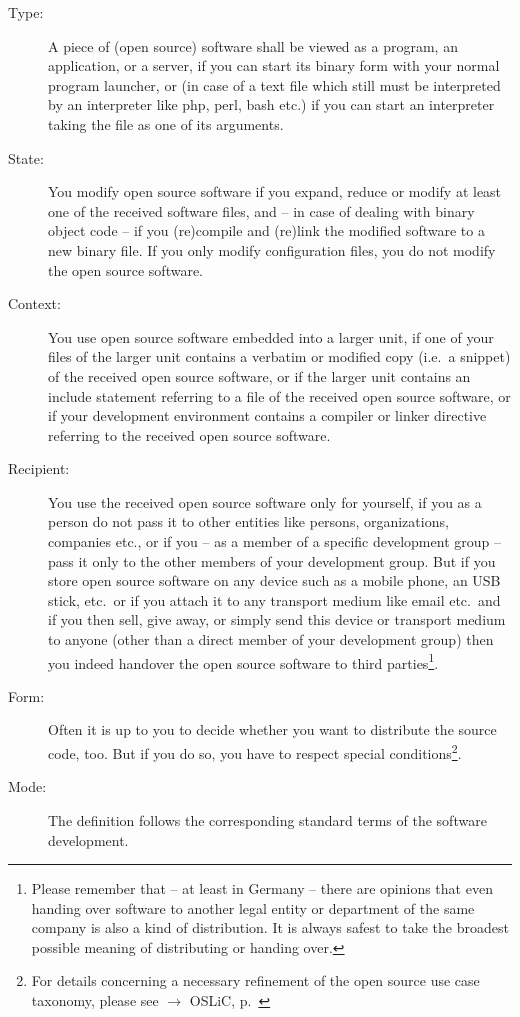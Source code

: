 \begin{description}
\item[Type:] A piece of (open source) software shall be viewed as a program, an
application, or a server, if you can start its binary form with your normal
program launcher, or (in case of a text file which still must be interpreted by
an interpreter like php, perl, bash etc.) if you can start an interpreter taking
the file as one of its arguments. \item[State:] You modify open source software
if you expand, reduce or modify at least one of the received software files, and
-- in case of dealing with binary object code -- if you (re)compile and (re)link
the modified software to a new binary file. If you only modify configuration
files, you do not modify the open source software.
\item[Context:] You use open source software embedded into a larger unit, if one
of your files of the larger unit contains a verbatim or modified copy (i.e.\ a
snippet) of the received open source software, or if the larger unit contains an
include statement referring to a file of the received open source software, or
if your development environment contains a compiler or linker directive
referring to the received open source software.
\item[Recipient:] You use the received open source software only for yourself,
if you as a person do not pass it to other entities like persons, organizations,
companies etc., or if you -- as a member of a specific development group -- pass
it only to the other members of your development group. But if you store open
source software on any device such as a mobile phone, an USB stick, etc.\ or if
you attach it to any transport medium like email etc.\ and if you then sell,
give away, or simply send this device or transport medium to anyone (other than
a direct member of your development group) then you indeed handover the open
source software to third parties\footnote{Please remember that -- at least in
Germany -- there are opinions that even handing over software to another legal
entity or department of the same company is also a kind of distribution. It is
always safest to take the broadest possible meaning of distributing or handing
over.}.
\item[Form:] Often it is up to you to decide whether you want to distribute the
source code, too. But if you do so, you have to respect special
conditions\footnote{For details concerning a necessary refinement of the open
source use case taxonomy, please see $\rightarrow$ OSLiC, p.\
\pageref{sec:SourceBinaryDifference}}.
\item[Mode:] The definition follows the corresponding standard terms of the
software development.
\end{description}

